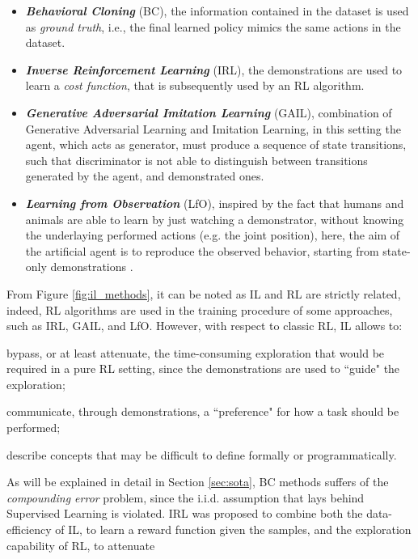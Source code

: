 \begin{itemize}
    \item \textbf{\textit{Behavioral Cloning}} (BC), the information contained in the dataset is used as \textit{ground
    truth}, i.e., the final learned policy mimics the same actions in the dataset.
    \item \textbf{\textit{Inverse Reinforcement Learning}} (IRL), the demonstrations are used to learn a \textit{cost
    function}, that is subsequently used by an RL algorithm.
    \item \textbf{\textit{Generative Adversarial Imitation Learning}} (GAIL), combination of Generative Adversarial Learning and Imitation Learning, in this
    setting the agent, which acts as generator, must produce a sequence of state transitions, such that
    discriminator is not able to distinguish between transitions generated by the agent, and demonstrated ones.
    \item \textbf{\textit{Learning from Observation}} (LfO), inspired by the fact that humans and animals are able to
    learn by just watching a demonstrator, without knowing the underlaying performed actions (e.g. the joint position),
    here, the aim of the artificial agent is to reproduce the observed behavior, starting from state-only demonstrations
    \cite{torabi2019recent_advances_lfo}.  
\end{itemize}

\noindent From Figure \ref{fig:il_methods}, it can be noted as IL and RL are strictly related, indeed, RL algorithms are used in
the training procedure of some approaches, such as IRL, GAIL, and LfO. However, with respect to classic RL, IL allows to:
\begin{enumerate*}[label=\textbf{(\arabic*)}]
    \item bypass, or at least attenuate, the time-consuming exploration that would be required in a pure RL setting, since the demonstrations are used to ``guide" the exploration;
    \item communicate, through demonstrations, a ``preference" for how a task should be performed;
    \item describe concepts that may be difficult to define formally or programmatically. \end{enumerate*} As will be
explained in detail in Section \ref{sec:sota}, BC methods suffers of the \textit{compounding error} problem, since the
i.i.d. assumption that lays behind Supervised Learning is violated. IRL was proposed to combine both the
data-efficiency of IL, to learn a reward function given the samples, and the exploration capability of RL, to attenuate

